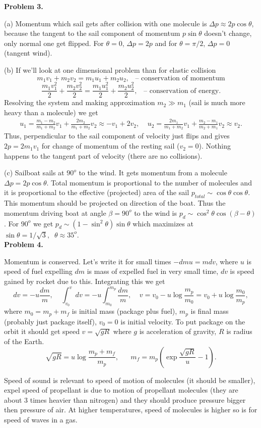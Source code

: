 \documentclass[12pt]{article}
\def\be{\begin{eqnarray}}
\def\ee{\end{eqnarray}}
\begin{document}
{\bf Problem 3.}

(a) Momentum which sail gets after collision with one molecule is $\Delta p\approx 2 p \cos\theta$,
because the tangent  to the sail  component of momentum $p\sin\theta$ doesn't change, only 
normal one get flipped. For $\theta=0$,  $\Delta p= 2 p $ and for  $\theta=\pi/2$,  $\Delta p= 0$
(tangent wind).

(b) If we'll look at one dimensional problem than for elastic collision
$$m_1 v_1 +m_2 v_2=m_1 u_1 +m_2 u_2,\;\;\;\mbox{-- conservation of momentum}$$
$$
\frac{m_1 v_1^2}{2} +\frac{m_2 v_2^2}{2}=\frac{m_1 u_1^2}{2} +\frac{m_2 u_2^2}{2},\;\;\;\mbox{-- conservation of energy.}$$
Resolving the system and making approximation $m_2\gg m_1$ (sail is much more heavy than a molecule)  we get
\be
u_1=\frac{m_1-m_2}{m_1+m_2}v_1 +\frac{2 m_2}{m_1+m_2}v_2\approx -v_1 +2v_2,\;\;\;\;
u_2=\frac{2 m_1}{m_1+m_2}v_1 +\frac{ m_2-m_1}{m_2+m_1}v_2\approx v_2.\nonumber
\ee
Thus, perpendicular to the sail component of velocity just flips and gives $2p=2m_1v_1$ for change of momentum of the resting sail ($v_2=0$). Nothing happens to the tangent part of velocity (there are no collisions). 

(c) Sailboat sails at $90^o$ to the wind. It gets momentum from a molecule
$\Delta p=2 p\cos\theta$. Total momentum is proportional to the number of molecules
and it is proportional to the effective (projected) area of the sail $p_{total}\sim\cos\theta\cos\theta$.
This momentum should be projected on direction of the boat. Thus the momentum
driving boat at angle $\beta=90^o$ to the wind is $p_d\sim  \cos^2\theta\cos(\beta-\theta)$.
For $90^o$ we get  $p_d\sim  (1-\sin^2\theta)\sin\theta$ which maximizes at $\sin\theta=1/\sqrt{3},\;\;\theta\approx 35^o$.
\\

{\bf Problem 4.}

Momentum is conserved. Let's write it for small times
$-dm u=m dv$, where $u$ is speed of fuel expelling $dm$ is mass of expelled fuel in very small
time, $dv$ is speed gained by rocket due to this. Integrating this we get 
$$dv=-u\frac{dm}{m},\;\;\;\;\int_{v_0}^{v}dv=-u\int_{m_0}^{m_p}\frac{dm}{m},\;\;\;\;v=v_0 -u\log\frac{m_p}{m_0}=v_0+u\log\frac{m_0}{m_p},$$
where $m_0=m_p+m_f$ is initial mass (package plus fuel), $m_p$ is final mass (probably just package itself),
$v_0=0$ is initial velocity. To put package on the orbit it should get speed $v=\sqrt{g R}$ where
$g$ is acceleration of gravity, $R$ is radius of the Earth.
$$\sqrt{g R}=u\log\frac{m_p+m_f}{m_p},\;\;\;\;\;\; m_f=m_p\left(\exp\frac{\sqrt{gR}}{u}-1\right).$$

Speed of sound  is relevant to speed of motion of molecules (it should be smaller), expel speed of propellant is due to motion of propellant molecules (they are about 3 times heavier than nitrogen) and they should produce pressure bigger then pressure of air. At higher temperatures, speed of molecules is higher so is for speed of waves in a gas.
\end{document}
